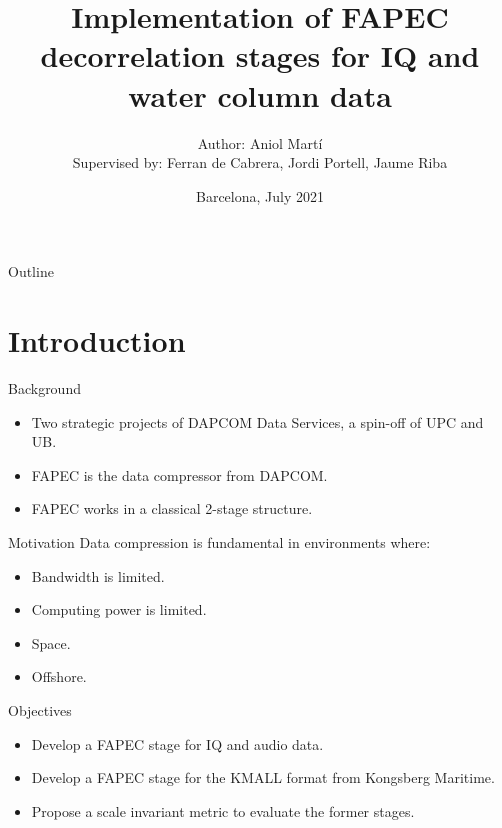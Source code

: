 \documentclass[usenames,dvipsnames]{beamer}
\title[FAPEC]{Implementation of FAPEC decorrelation stages for IQ and water column data}
\date[July 2021]{Barcelona, July 2021}
\author[Aniol Martí]{
  Author: Aniol Martí\\
  Supervised by: Ferran de Cabrera, Jordi Portell, Jaume Riba
}
\institute{Universitat Politècnica de Catalunya}
\begin{document}
\begin{frame}
\titlepage
\end{frame}

\begin{frame}{Outline}
\tableofcontents
\end{frame}


\section{Introduction}
\begin{frame}{Background}
\begin{itemize}
	\item Two strategic projects of DAPCOM Data Services, a spin-off of UPC and UB.
	\item FAPEC is the data compressor from DAPCOM.
	\item<2> FAPEC works in a classical 2-stage structure.
\end{itemize}
\vspace{1.5em}
\centering
{}\scalebox{.515}{}
\end{frame}

\begin{frame}{Motivation}
Data compression is fundamental in environments where:
\begin{itemize}
	\item<1-> Bandwidth is limited.
	\item<1-> Computing power is limited.
\end{itemize}
\vspace{1em}

\begin{itemize}
	\item<2-> Space.
	\item<2-> Offshore.
\end{itemize}
\end{frame}

\begin{frame}{Objectives}
\begin{itemize}
	\item Develop a FAPEC stage for IQ and audio data.
	\item Develop a FAPEC stage for the KMALL format from Kongsberg Maritime.
	\item Propose a scale invariant metric to evaluate the former stages. 
\end{itemize}
\end{frame}
\end{document}
